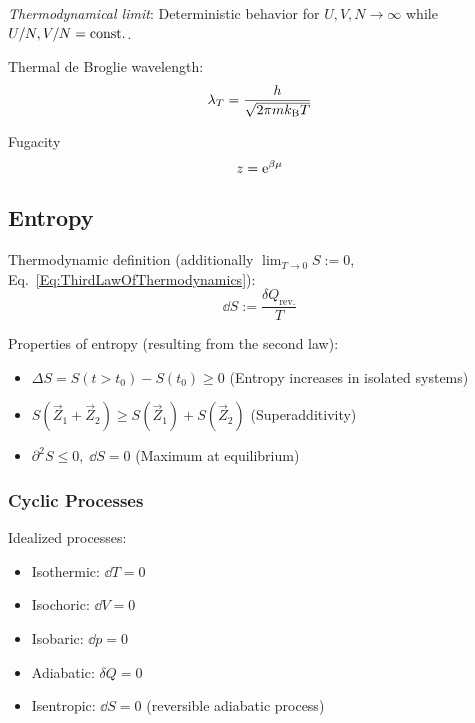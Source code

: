 		\emph{Thermodynamical limit}: \newline Deterministic behavior for $U,V,N\rightarrow\infty$ while $U/N,V/N=\mathrm{const.}$. \vsp

		\noindent
		Thermal de Broglie wavelength:
		\begin{equation}
			\label{Eq:ThermalDeBroglieWavelength}
			\lambda_T = \frac{h}{\sqrt{2\pi m k_{\text{B}} T}}
		\end{equation} \vsp

		\noindent
		Fugacity
		\begin{equation}
			z = \mathrm{e}^{\beta\mu}
		\end{equation} \vsp

	\subsection{Entropy}
		\noindent
		Thermodynamic definition (additionally $\lim_{T\rightarrow 0} S := 0$, Eq.~\ref{Eq:ThirdLawOfThermodynamics}):
		\begin{equation}
			\dd S := \frac{\delta Q_\text{rev.}}{T}
		\end{equation}

		\noindent
		Properties of entropy (resulting from the second law):
		\begin{itemize}\itemsep -0pt	%
			\item $\Delta S = S(t>t_0)-S(t_0) \ge 0$ \hfill{(Entropy increases in isolated systems)}
			\item $S(\vec{Z}_1 + \vec{Z}_2) \ge S(\vec{Z}_1) + S(\vec{Z}_2)$ \hfill{(Superadditivity)}
			\item $\partial^2 S \le 0,\;\dd S = 0$ \hfill{(Maximum at equilibrium)}
		\end{itemize}

		\subsubsection{Cyclic Processes}
			\noindent
			Idealized processes:
			\begin{itemize}
				\item Isothermic: $\dd T = 0$
				\item Isochoric: $\dd V = 0$
				\item Isobaric: $\dd p = 0$
				\item Adiabatic: $\delta Q = 0$
				\item Isentropic: $\dd S = 0$ (reversible adiabatic process)
			\end{itemize}

